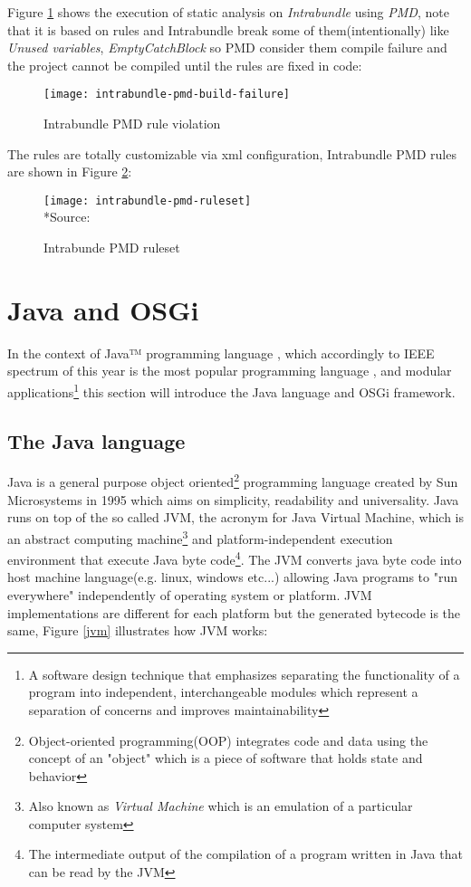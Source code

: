 \FloatBarrier

Figure \ref{pmd violation} shows the execution of static analysis on \textit{Intrabundle} using \emph{PMD}, note that it is based on rules and Intrabundle break some of them(intentionally) like \emph{Unused variables}, \emph{EmptyCatchBlock} so PMD consider them compile failure and the project cannot be compiled until the rules are fixed in code:

\begin{figure}[h]
\label{pmd violation}
\caption{Intrabundle PMD rule violation}
\centering
\texttt{[image: intrabundle-pmd-build-failure]}
\end{figure}

\FloatBarrier

The rules are totally customizable via xml configuration, Intrabundle PMD rules are shown in Figure \ref{pmd ruleset}:

\begin{figure}[h]
\label{pmd ruleset}
\caption{Intrabunde PMD ruleset}
\centering
\texttt{[image: intrabundle-pmd-ruleset]}
\\*Source: \cite{intrabundle pmd 2014}
\end{figure}

\FloatBarrier

\section{Java and OSGi}

In the context of Java™ programming language \citep{Arnold 2005}, which accordingly to IEEE spectrum of this year is the most popular programming language \citep{ieee spectrum 2014}, and modular applications\footnote{A software design technique that emphasizes separating the functionality of a program into independent, interchangeable modules which represent a separation of concerns and improves maintainability} this section will introduce the Java language and OSGi framework.

\subsection{The Java language}
Java is a general purpose object oriented\footnote{Object-oriented programming(OOP) integrates code and data using the concept of an "object" which is a piece of software that holds state and behavior} programming language created by Sun Microsystems in 1995 which aims on simplicity, readability and universality. Java runs on top of the so called JVM, the acronym for Java Virtual Machine, which is an abstract computing machine\footnote{Also known as \textit{Virtual Machine} which is an emulation of a particular computer system} and platform-independent execution environment that execute Java byte code\footnote{The intermediate output of the compilation of a program written in Java that can be read by the JVM}. The JVM converts java byte code into host machine language(e.g. linux, windows etc...) allowing Java programs to "run everywhere" independently of operating system or platform. JVM implementations are different for each platform but the generated bytecode is the same, Figure \ref{jvm} illustrates how JVM works:

